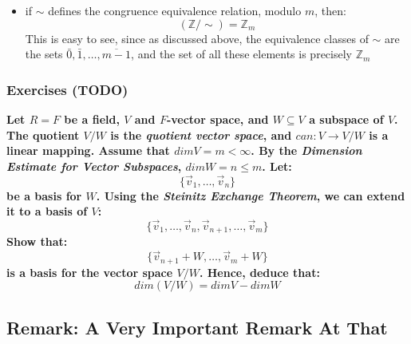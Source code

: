 \documentclass{exam}
\begin{document}
\begin{itemize}
    \item if $\sim$ defines the congruence equivalence relation, modulo $m$, then:
    \[
    (\mathbb{Z} / \sim) = \mathbb{Z}_m
    \]
    This is easy to see, since as discussed above, the equivalence classes of $\sim$ are the sets $\bar{0}, \bar{1}, \ldots, \overline{m-1}$, and the set of all these elements is precisely $\mathbb{Z}_m$
\end{itemize}

\subsubsection{Exercises (TODO)}

\begin{questions}

\question \textbf{Let $R = F$ be a field, $V$ and $F$-vector space, and $W \subseteq V$ a subspace of $V$. The quotient $V/W$ is the \textit{quotient vector space}, and $can : V \to V/W$ is a linear mapping.
Assume that $dim V = m < \infty$. By the \textit{Dimension Estimate for Vector Subspaces}, $dim W = n \leq m$. Let:
\[
\{\vec{v}_1, \ldots, \vec{v}_n\}
\]
be a basis for $W$. Using the \textit{Steinitz Exchange Theorem}, we can extend it to a basis of $V$:
\[
\{\vec{v}_1, \ldots, \vec{v}_n, \vec{v}_{n+1}, \ldots, \vec{v}_m\}
\]
Show that:
\[
\{\vec{v}_{n+1} + W, \ldots, \vec{v}_m + W\}
\]
is a basis for the vector space $V / W$. Hence, deduce that:
\[
dim(V /W) = dim V - dim W
\]
}

\end{questions}

\subsection{Remark: A Very Important Remark At That}\label{vir}

\end{document}
